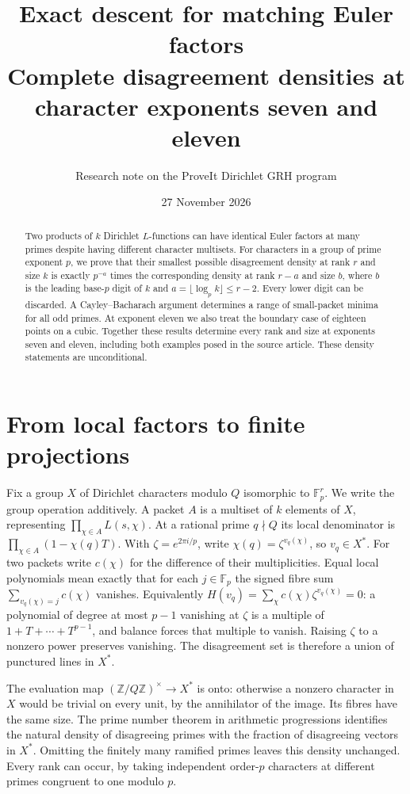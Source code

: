 \documentclass[11pt]{article}
\title{Exact descent for matching Euler factors\\[4pt]\large Complete disagreement densities at character exponents seven and eleven}
\author{Research note on the ProveIt Dirichlet GRH program}
\date{27 November 2026}
\begin{document}
\maketitle
\begin{abstract}
Two products of $k$ Dirichlet $L$-functions can have identical Euler factors at many primes despite having different character multisets. For characters in a group of prime exponent $p$, we prove that their smallest possible disagreement density at rank $r$ and size $k$ is exactly $p^{-a}$ times the corresponding density at rank $r-a$ and size $b$, where $b$ is the leading base-$p$ digit of $k$ and $a=\lfloor\log_p k\rfloor\le r-2$. Every lower digit can be discarded. A Cayley--Bacharach argument determines a range of small-packet minima for all odd primes. At exponent eleven we also treat the boundary case of eighteen points on a cubic. Together these results determine every rank and size at exponents seven and eleven, including both examples posed in the source article. These density statements are unconditional.
\end{abstract}
\section{From local factors to finite projections}
Fix a group $X$ of Dirichlet characters modulo $Q$ isomorphic to $\mathbb F_p^r$. We write the group operation additively. A packet $A$ is a multiset of $k$ elements of $X$, representing $\prod_{\chi\in A}L(s,\chi)$. At a rational prime $q\nmid Q$ its local denominator is $\prod_{\chi\in A}(1-\chi(q)T)$. With $\zeta=e^{2\pi i/p}$, write $\chi(q)=\zeta^{v_q(\chi)}$, so $v_q\in X^*$. For two packets write $c(\chi)$ for the difference of their multiplicities. Equal local polynomials mean exactly that for each $j\in\mathbb F_p$ the signed fibre sum $\sum_{v_q(\chi)=j}c(\chi)$ vanishes. Equivalently $H(v_q)=\sum_\chi c(\chi)\zeta^{v_q(\chi)}=0$: a polynomial of degree at most $p-1$ vanishing at $\zeta$ is a multiple of $1+T+\cdots+T^{p-1}$, and balance forces that multiple to vanish. Raising $\zeta$ to a nonzero power preserves vanishing. The disagreement set is therefore a union of punctured lines in $X^*$.

The evaluation map $(\mathbb Z/Q\mathbb Z)^\times\to X^*$ is onto: otherwise a nonzero character in $X$ would be trivial on every unit, by the annihilator of the image. Its fibres have the same size. The prime number theorem in arithmetic progressions identifies the natural density of disagreeing primes with the fraction of disagreeing vectors in $X^*$. Omitting the finitely many ramified primes leaves this density unchanged. Every rank can occur, by taking independent order-$p$ characters at different primes congruent to one modulo $p$.
\end{document}

